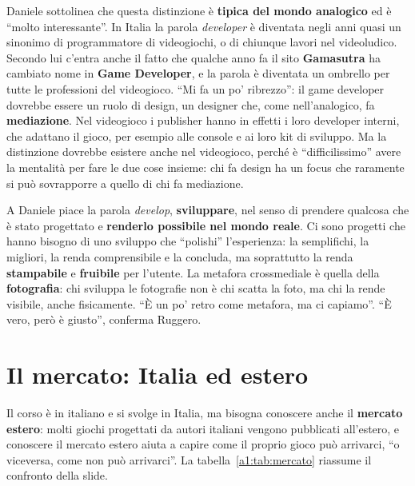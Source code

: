 Daniele sottolinea che questa distinzione è \textbf{tipica del mondo analogico}
ed è ``molto interessante''. In Italia la parola \emph{developer} è diventata
negli anni quasi un sinonimo di programmatore di videogiochi, o di chiunque
lavori nel videoludico. Secondo lui c'entra anche il fatto che qualche anno fa
il sito \textbf{Gamasutra} ha cambiato nome in \textbf{Game Developer}, e la
parola è diventata un ombrello per tutte le professioni del videogioco. ``Mi fa
un po' ribrezzo'': il game developer dovrebbe essere un ruolo di design, un
designer che, come nell'analogico, fa \textbf{mediazione}. Nel videogioco i
publisher hanno in effetti i loro developer interni, che adattano il gioco, per
esempio alle console e ai loro kit di sviluppo. Ma la distinzione dovrebbe
esistere anche nel videogioco, perché è ``difficilissimo'' avere la mentalità
per fare le due cose insieme: chi fa design ha un focus che raramente si può
sovrapporre a quello di chi fa mediazione.

A Daniele piace la parola \emph{develop}, \textbf{sviluppare}, nel senso di
prendere qualcosa che è stato progettato e \textbf{renderlo possibile nel mondo
reale}. Ci sono progetti che hanno bisogno di uno sviluppo che ``polishi''
l'esperienza: la semplifichi, la migliori, la renda comprensibile e la concluda,
ma soprattutto la renda \textbf{stampabile} e \textbf{fruibile} per l'utente. La
metafora crossmediale è quella della \textbf{fotografia}: chi sviluppa le
fotografie non è chi scatta la foto, ma chi la rende visibile, anche
fisicamente. ``È un po' retro come metafora, ma ci capiamo''. ``È vero, però è
giusto'', conferma Ruggero.

\section{Il mercato: Italia ed estero}
\label{a1:sec:mercato}

Il corso è in italiano e si svolge in Italia, ma bisogna conoscere anche il
\textbf{mercato estero}: molti giochi progettati da autori italiani vengono
pubblicati all'estero, e conoscere il mercato estero aiuta a capire come il
proprio gioco può arrivarci, ``o viceversa, come non può arrivarci''. La
tabella~\ref{a1:tab:mercato} riassume il confronto della slide.

